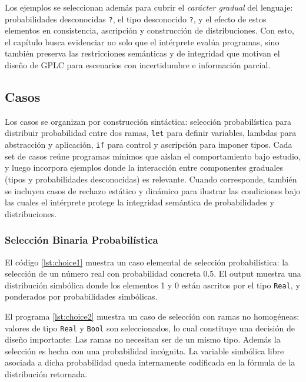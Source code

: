 Los ejemplos se seleccionan además para cubrir el \emph{carácter
  gradual} del lenguaje: probabilidades desconocidas \verb|?|, el tipo
desconocido \verb|?|, y el efecto de estos elementos en consistencia,
ascripción y construcción de distribuciones. Con esto, el capítulo
busca evidenciar no solo que el intérprete evalúa programas, sino
también preserva las restricciones semánticas y de integridad que
motivan el diseño de GPLC para escenarios con incertidumbre e
información parcial.



\subsection{Casos}

Los casos se organizan por construcción sintáctica: selección
probabilística para distribuir probabilidad entre dos ramas,
\lstinline|let| para definir variables, lambdas para abstracción y
aplicación, \lstinline|if| para control y ascripción para imponer
tipos. Cada set de casos reúne programas mínimos que aíslan el
comportamiento bajo estudio, y luego incorpora ejemplos donde la
interacción entre componentes graduales (tipos y probabilidades
desconocidas) es relevante. Cuando corresponde, también se incluyen
casos de rechazo estático y dinámico para ilustrar las condiciones
bajo las cuales el intérprete protege la integridad semántica de
probabilidades y distribuciones.

\subsubsection{Selección Binaria Probabilística}
El código \ref{lst:choice1} muestra un caso elemental
de selección probabilística: la selección de un
número real con probabilidad concreta 0.5. El
output muestra una distribución simbólica donde
los elementos 1 y 0 están ascritos por el tipo
\lstinline|Real|, y ponderados por probabilidades simbólicas.






El programa \ref{lst:choice2} muestra un caso de selección
con ramas no homogéneas: valores de tipo \lstinline|Real| y
\lstinline|Bool| son seleccionados, lo cual
constituye una decisión
de diseño importante: Las ramas no
necesitan ser de un mismo tipo. Además la selección
es hecha con una probabilidad incógnita. La variable
simbólica libre asociada a dicha probabilidad queda
internamente codificada en la fórmula de la distribución
retornada.







